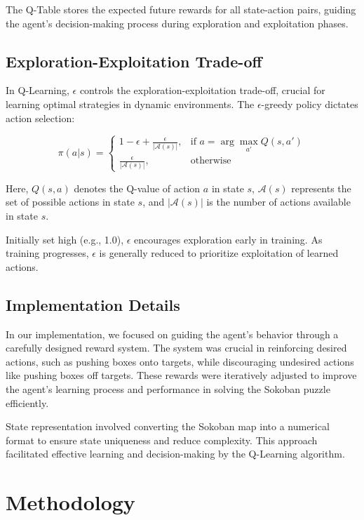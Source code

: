 \documentclass[10pt,twocolumn]{article}
\begin{document}
The Q-Table stores the expected future rewards for all state-action pairs, guiding the agent's decision-making process during exploration and exploitation phases.

\subsection{Exploration-Exploitation Trade-off}

In Q-Learning, \( \epsilon \) controls the exploration-exploitation trade-off, crucial for learning optimal strategies in dynamic environments. The \( \epsilon \)-greedy policy dictates action selection:

\[
    \pi(a|s) =
    \begin{cases}
        1 - \epsilon + \frac{\epsilon}{|\mathcal{A}(s)|}, & \text{if } a = \arg\max_{a'} Q(s, a') \\
        \frac{\epsilon}{|\mathcal{A}(s)|},                & \text{otherwise}
    \end{cases}
\]

Here, \( Q(s, a) \) denotes the Q-value of action \( a \) in state \( s \), \( \mathcal{A}(s) \) represents the set of possible actions in state \( s \), and \( |\mathcal{A}(s)| \) is the number of actions available in state \( s \).

Initially set high (e.g., 1.0), \( \epsilon \) encourages exploration early in training. As training progresses, \( \epsilon \) is generally reduced to prioritize exploitation of learned actions.

\subsection{Implementation Details}

In our implementation, we focused on guiding the agent's behavior through a carefully designed reward system. The system was crucial in reinforcing desired actions, such as pushing boxes onto targets, while discouraging undesired actions like pushing boxes off targets. These rewards were iteratively adjusted to improve the agent's learning process and performance in solving the Sokoban puzzle efficiently.

State representation involved converting the Sokoban map into a numerical format to ensure state uniqueness and reduce complexity. This approach facilitated effective learning and decision-making by the Q-Learning algorithm.

\section{Methodology}
\end{document}
